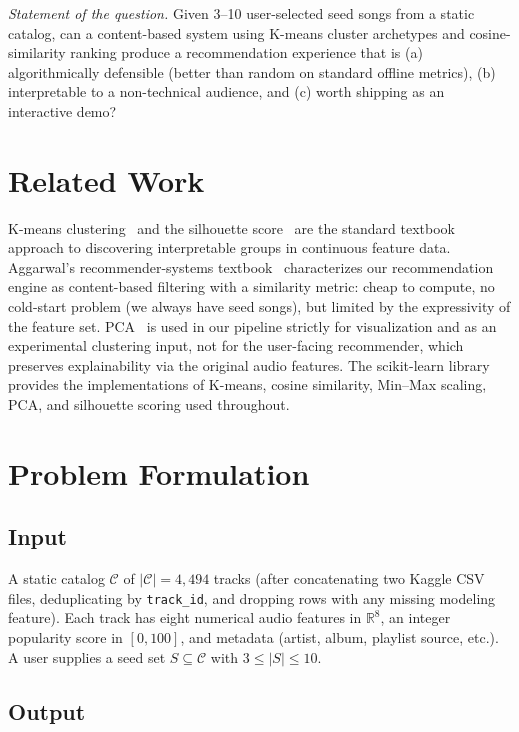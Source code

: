 \documentclass[letterpaper, 10 pt, conference]{ieeeconf}
\begin{document}
\emph{Statement of the question.} Given 3--10 user-selected seed songs from a static catalog, can a content-based system using K-means cluster archetypes and cosine-similarity ranking produce a recommendation experience that is (a) algorithmically defensible (better than random on standard offline metrics), (b) interpretable to a non-technical audience, and (c) worth shipping as an interactive demo?

\section{Related Work}

K-means clustering~\cite{macqueen1967kmeans} and the silhouette score~\cite{rousseeuw1987silhouettes} are the standard textbook approach to discovering interpretable groups in continuous feature data. Aggarwal's recommender-systems textbook~\cite{aggarwal2016recommender} characterizes our recommendation engine as content-based filtering with a similarity metric: cheap to compute, no cold-start problem (we always have seed songs), but limited by the expressivity of the feature set. PCA~\cite{jolliffe2016pca} is used in our pipeline strictly for visualization and as an experimental clustering input, not for the user-facing recommender, which preserves explainability via the original audio features. The scikit-learn library~\cite{pedregosa2011scikit} provides the implementations of K-means, cosine similarity, Min--Max scaling, PCA, and silhouette scoring used throughout.

\section{Problem Formulation}

\subsection{Input}

A static catalog $\mathcal{C}$ of $|\mathcal{C}|{=}4{,}494$ tracks (after concatenating two Kaggle CSV files, deduplicating by \texttt{track\_id}, and dropping rows with any missing modeling feature). Each track has eight numerical audio features in $\mathbb{R}^8$, an integer popularity score in $[0,100]$, and metadata (artist, album, playlist source, etc.). A user supplies a seed set $S \subseteq \mathcal{C}$ with $3 \leq |S| \leq 10$.

\subsection{Output}
\end{document}
